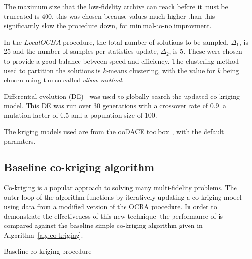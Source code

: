 The maximum size that the low-fidelity archive can reach before it must be truncated is 400, this was chosen because values much higher than this significantly slow the procedure down, for minimal-to-no improvment. 

In the $LocalOCBA$ procedure, the total number of solutions to be sampled, $\Delta_1$, is 25 and the number of samples per statistics update, $\Delta_2$, is 5. These were chosen to provide a good balance between speed and efficiency. The clustering method used to partition the solutions is $k$-means clustering, with the value for $k$ being chosen using the so-called \emph{elbow method}.

Differential evolution (DE)~\cite{storn1997differential} was used to globally search the updated co-kriging model. This DE was run over 30 generations with a crossover rate of 0.9, a mutation factor of 0.5 and a population size of 100.

The kriging models used are from the ooDACE toolbox~\cite{oodace}, with the default paramters.

\subsection{Baseline co-kriging algorithm}
Co-kriging is a popular approach to solving many multi-fidelity problems. The outer-loop of the \AlgName{} algorithm functions by iteratively updating a co-kriging model using data from a modified version of the OCBA procedure. In order to demonstrate the effectiveness of this new technique, the performance of \AlgName{} is compared against the baseline simple co-kriging algorithm given in Algorithm~\ref{alg:co-kriging}.


\begin{algorithm}[h!] 
\caption{Baseline co-kriging procedure}
\label{alg:co-kriging}
{\footnotesize
\begin{algorithmic}[1]
 
  
   
     
  \ENDIF
   
   
   
   
   
\ENDWHILE
\end{algorithmic}
}
\end{algorithm}

